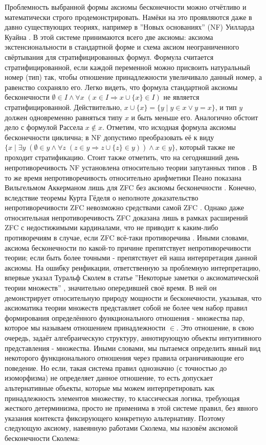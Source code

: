 \documentclass[12pt]{article}
\begin{document}
Проблемность выбранной формы аксиомы бесконечности можно отчётливо и математически строго продемонстрировать. Намёки на это проявляются даже в давно существующих теориях, например в ''Новых основаниях'' (NF) Уилларда Куайна \cite{quine-new-foundations}. В этой системе принимаются всего две аксиомы: аксиома экстенсиональности в стандартной форме и схема аксиом неограниченного свёртывания для стратифицированных формул. Формула считается стратифицированной, если каждой переменной можно присвоить натуральный номер (тип) так, чтобы отношение принадлежности увеличивало данный номер, а равенство сохраняло его. Легко видеть, что формула стандартной аксиомы бесконечности $\emptyset \in I \wedge \forall x \; (x \in I \Rightarrow x \cup \{ x \} \in I)$ не является стратифицированной. Действительно, $x \cup \{ x \} = \{ y \mid y \in x \vee y = x \}$, и тип $y$ должен одновременно равняться типу $x$ и быть меньше его. Аналогично обстоит дело с формулой Рассела $x \notin x$. Отметим, что исходная формула аксиомы бесконечности циклична; в NF допустимо преобразовать её к виду $\{ x \mid \exists y \; (\emptyset \in y \wedge \forall z \; (z \in y \Rightarrow z \cup \{ z \} \in y)) \wedge x \in y \}$, который также не проходит стратификацию. Стоит также отметить, что на сегодняшний день непротиворечивость NF установлена относительно теории запутанных типов \cite{holmes-nf-consistent}. В то же время непротиворечивость относительно арифметики Пеано показана Вильгельмом Аккерманом лишь для ZFC без аксиомы бесконечности \cite{ackermann-zfc-consistent}. Конечно, вследствие теоремы Курта Гёделя о неполноте доказательство непротиворечивости ZFC невозможно средствами самой ZFC \cite{godel-incompletness}. Однако даже относительная непротиворечивость ZFC доказана лишь в рамках расширений ZFC с недостижимыми кардиналами, что не приводит к каким-либо противоречиям в случае, если ZFC всё-таки противоречива \cite{kinamori-zfc-consistent}. Иными словами, аксиома бесконечности по какой-то причине препятствует непротиворечивости теории; если быть более точными - препятствует ей наша интерпретация данной аксиомы. На ошибку реификации, ответственную за проблемную интерпретацию, впервые указал Туральф Сколем в статье ''Некоторые заметки о аксиоматической теории множеств'' \cite{skolem-set-theory}, значительно опередившей своё время. В ней он демонстрирует относительную природу мощности и бесконечности, указывая, что аксиоматика теории множеств представляет собой не более чем набор правил формирования определённого функционального отношения - множества пар, которое мы называем отношением принадлежности $\in$. Это отношение, в свою очередь, задаёт алгебраическую структуру, аннотирующую объекты интуитивного представления - множества. Иными словами, мы пытаемся определить явный вид некоторого функционального отношения через правила ограничивающие его поведение. Но если, такая система правил однозначно (с точностью до изоморфизма) не определяет данное отношение, то есть допускает альтернативные объекты, которые мы можем интерпретировать как принадлежность элементов множеству, то классическая логика, требующая жесткого детерминизма, просто не применима в этой системе правил, без явного указания контекста фиксирующего конкретную альтернативу. Поэтому следующую аксиому, навеянную работами Сколема, мы назовём аксиомой бесконечности Сколема:
\end{document}
